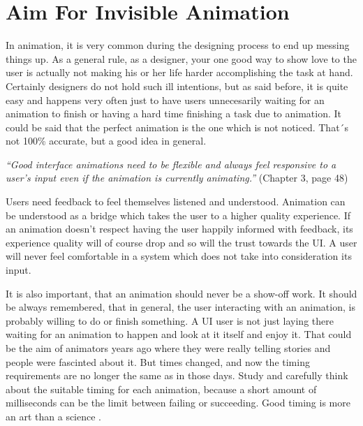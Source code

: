 \section{Aim For Invisible Animation} %
\label{sec:anime_invisible}

In animation, it is very common during the designing process to end up messing 
things up. As a general rule, as a designer, your one good way to show love to 
the user is actually not making his or her life harder accomplishing the task 
at hand. Certainly designers do not hold such ill intentions, but as said 
before, it is quite easy and happens very often just to have users unnecesarily 
waiting for an animation to finish or having a hard time finishing a task due 
to animation. It could be said that the perfect animation is the one which is 
not noticed. That´s not 100\% accurate, but a good idea in general. 

\vspace{5mm}

{\em“Good interface animations need to be flexible and always feel responsive 
to a user’s input even if the animation is currently 
animating.”}\citet{head2016designing} (Chapter 3, page 48)

\vspace{5mm}

Users need feedback to feel themselves listened and understood. Animation can 
be understood as a bridge which takes the user to a higher quality experience. 
If an animation doesn’t respect having the user happily informed with 
feedback, its experience quality will of course drop and so will the trust 
towards the UI. A user will never feel comfortable in a system which does not 
take into consideration its input. 

It is also important, that an animation should never be a show-off work. It 
should be always remembered, that in general, the user interacting with an 
animation, is probably willing to do or finish something. A UI user is not just 
laying there waiting for an animation to happen and look at it itself and enjoy 
it. That could be the aim of animators years ago where they were really telling 
stories and people were fascinted about it. But times changed, and now the 
timing requirements are no longer the same as in those days. Study and 
carefully think about the suitable timing for each animation, because a short 
amount of milliseconds can be the limit between failing or succeeding. Good 
timing is more an art than a science \citep{head2016designing}.

